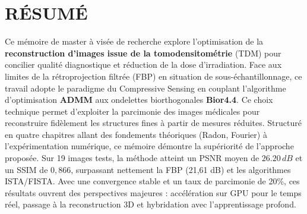 \chapter*{RÉSUMÉ}
Ce mémoire de master à visée de recherche explore l'optimisation de la \textbf{reconstruction d'images issue de la tomodensitométrie} (TDM) pour concilier qualité diagnostique et réduction de la dose d'irradiation. Face aux limites de la rétroprojection filtrée (FBP) en situation de sous-échantillonnage, ce travail adopte le paradigme du Compressive Sensing en couplant l'algorithme d'optimisation \textbf{ADMM} aux ondelettes biorthogonales \textbf{Bior4.4}. Ce choix technique permet d'exploiter la parcimonie des images médicales pour reconstruire fidèlement les structures fines à partir de mesures réduites.
Structuré en quatre chapitres allant des fondements théoriques (Radon, Fourier) à l'expérimentation numérique, ce mémoire démontre la supériorité de l'approche proposée. Sur 19 images tests, la méthode atteint un PSNR moyen de $26.20\,dB$ et un SSIM de $0,866$, surpassant nettement la FBP (21,61 dB) et les algorithmes ISTA/FISTA. Avec une convergence stable et un taux de parcimonie de 20\%, ces résultats ouvrent des perspectives majeures : accélération sur GPU pour le temps réel, passage à la reconstruction 3D et hybridation avec l'apprentissage profond.